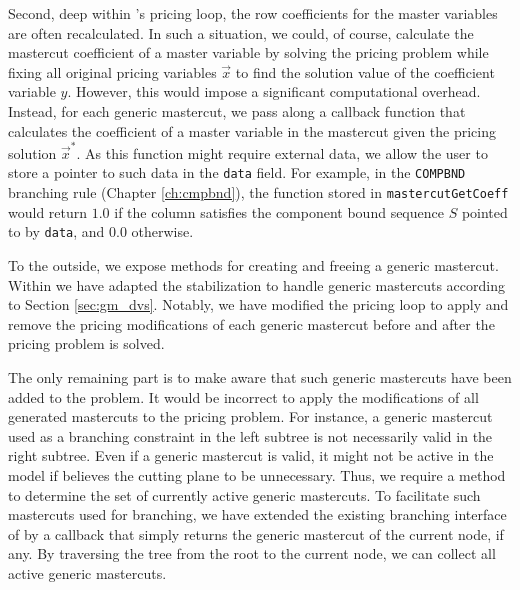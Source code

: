 Second, deep within \GCG{}'s pricing loop, the row coefficients for the master variables are often recalculated. In such a situation, we could, of course, calculate the mastercut coefficient of a master variable by solving the pricing problem while fixing all original pricing variables $\vec{x}$ to find the solution value of the coefficient variable $y$. However, this would impose a significant computational overhead. Instead, for each generic mastercut, we pass along a callback function that calculates the coefficient of a master variable in the mastercut given the pricing solution $\vec{x}^*$. As this function might require external data, we allow the user to store a pointer to such data in the \texttt{data} field. For example, in the \texttt{COMPBND} branching rule (Chapter \ref{ch:cmpbnd}), the function stored in \texttt{mastercutGetCoeff} would return $1.0$ if the column satisfies the component bound sequence $S$ pointed to by \texttt{data}, and $0.0$ otherwise.

To the outside, we expose methods for creating and freeing a generic mastercut. Within \GCG{} we have adapted the stabilization to handle generic mastercuts according to Section \ref{sec:gm_dvs}. Notably, we have modified the pricing loop to apply and remove the pricing modifications of each generic mastercut before and after the pricing problem is solved.

The only remaining part is to make \GCG{} aware that such generic mastercuts have been added to the problem. It would be incorrect to apply the modifications of all generated mastercuts to the pricing problem. For instance, a generic mastercut used as a branching constraint in the left subtree is not necessarily valid in the right subtree. Even if a generic mastercut is valid, it might not be active in the model if \SCIP{} believes the cutting plane to be unnecessary. Thus, we require a method to determine the set of currently active generic mastercuts. To facilitate such mastercuts used for branching, we have extended the existing branching interface of \GCG{} by a callback that simply returns the generic mastercut of the current node, if any. By traversing the tree from the root to the current node, we can collect all active generic mastercuts.
